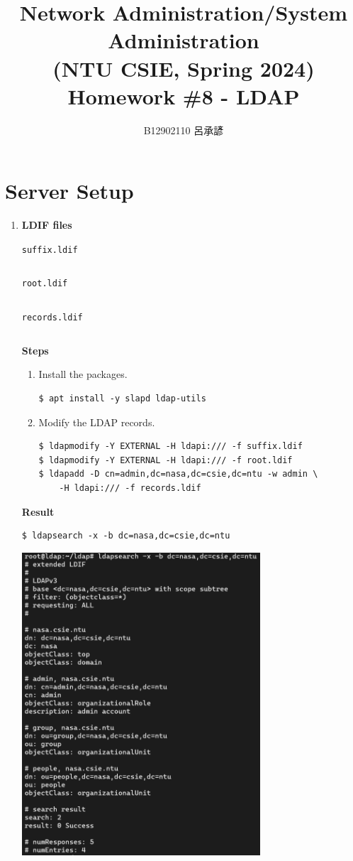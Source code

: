 \documentclass[12pt, a4paper]{article}
\title{
  \vspace{-1cm}
  Network Administration/System Administration\\
  (NTU CSIE, Spring 2024)\\
  Homework \#8 - LDAP
}
\author{\Large B12902110 呂承諺}
\begin{document}
  \maketitle
  \section{Server Setup}
  \begin{enumerate}[label=(\alph*)]
    \item \textbf{LDIF files}

    \verb|suffix.ldif|
    \inputminted[fontsize=\footnotesize]{ldif}{ldif/suffix.ldif}

    \verb|root.ldif|
    \inputminted[fontsize=\footnotesize]{ldif}{ldif/root.ldif}

    \verb|records.ldif|
    \inputminted[fontsize=\footnotesize]{ldif}{ldif/records.ldif}

    \pagebreak
    \textbf{Steps}
    \begin{enumerate}[label=(\arabic*)]
      \item Install the packages.
      \begin{Verbatim}[frame=single]
$ apt install -y slapd ldap-utils
      \end{Verbatim}
      \item Modify the LDAP records.
      \begin{Verbatim}[frame=single]
$ ldapmodify -Y EXTERNAL -H ldapi:/// -f suffix.ldif
$ ldapmodify -Y EXTERNAL -H ldapi:/// -f root.ldif
$ ldapadd -D cn=admin,dc=nasa,dc=csie,dc=ntu -w admin \
    -H ldapi:/// -f records.ldif
      \end{Verbatim}
    \end{enumerate}

    \textbf{Result}
    \begin{Verbatim}[frame=single]
$ ldapsearch -x -b dc=nasa,dc=csie,dc=ntu
    \end{Verbatim}

    \includegraphics[width=0.7\textwidth]{1-a_ldapsearch.png}


\end{enumerate}
\end{document}
